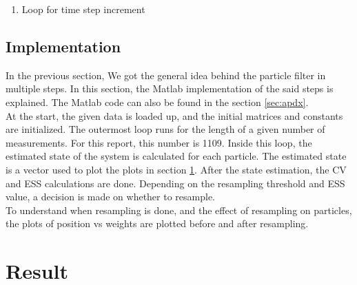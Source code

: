 \documentclass{article}
\begin{document}
\begin{enumerate}
The resampling pseudo-code was provided. This code is given below and is used with minor changes.
\begin{verbatim}
  Assume particle states in P[1...M], weights in W[1...M].

  Q=cumsum(W);          calculate the running totals  
  t=rand(M+1);          t is an array of M+1 uniform random numbers 0 to 1
  T=sort(t);            sort them smallest to largest
  T[M+1]=1.0;           boundary condition for cumulative hist
  i=j=1;                arrays start at 1
  while (i<=M)
    if (T[i] < Q[j])
      Index[i]=j;
      i=i+1;
    else
      j=j+1;
    end if
  end while

  loop (i=1; i<=M; i=i+1)
    NewP[i]=P[index[i]];
    NewW[i]=1/M;
  end loop
\end{verbatim}

\item Loop for time step increment
\end{enumerate}

\subsection{Implementation}\label{subsec:2}
In the previous section, We got the general idea behind the particle filter in multiple steps. In this section, the Matlab implementation of the said steps is explained.
The Matlab code can also be found in the section \ref{sec:apdx}.\\
At the start, the given data is loaded up, and the initial matrices and constants are initialized. The outermost loop runs for the length of a given number of measurements. For this report, this number is 1109. Inside this loop, the estimated state of the system is calculated for each particle. The estimated state is a vector used to plot the plots in section \ref{sec:res}. After the state estimation, the CV and ESS calculations are done. Depending on the resampling threshold and ESS value, a decision is made on whether to resample.\\
To understand when resampling is done, and the effect of resampling on particles, the plots of position vs weights are plotted before and after resampling.\\

\section{Result}\label{sec:res}
\end{document}
